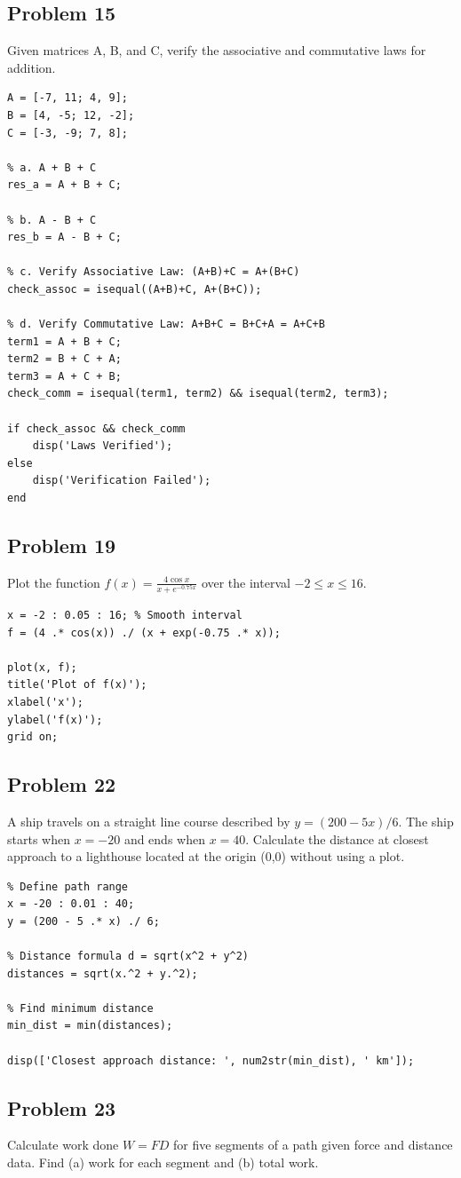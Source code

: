 \documentclass[DIN, pagenumber=false, fontsize=11pt, parskip=half]{scrartcl}
\newcommand{\myproblem}[1]{\subsection*{#1}}
\begin{document}
\myproblem{Problem 15}
Given matrices A, B, and C, verify the associative and commutative laws for addition.

\begin{lstlisting}
A = [-7, 11; 4, 9];
B = [4, -5; 12, -2];
C = [-3, -9; 7, 8];

% a. A + B + C
res_a = A + B + C;

% b. A - B + C
res_b = A - B + C;

% c. Verify Associative Law: (A+B)+C = A+(B+C)
check_assoc = isequal((A+B)+C, A+(B+C));

% d. Verify Commutative Law: A+B+C = B+C+A = A+C+B
term1 = A + B + C;
term2 = B + C + A;
term3 = A + C + B;
check_comm = isequal(term1, term2) && isequal(term2, term3);

if check_assoc && check_comm
    disp('Laws Verified');
else
    disp('Verification Failed');
end
\end{lstlisting}

\myproblem{Problem 19}
Plot the function $f(x)=\frac{4 \cos x}{x+e^{-0.75x}}$ over the interval $-2\le x\le16$.

\begin{lstlisting}
x = -2 : 0.05 : 16; % Smooth interval
f = (4 .* cos(x)) ./ (x + exp(-0.75 .* x));

plot(x, f);
title('Plot of f(x)');
xlabel('x');
ylabel('f(x)');
grid on;
\end{lstlisting}

\myproblem{Problem 22}
A ship travels on a straight line course described by $y=(200-5x)/6$. The ship starts when $x=-20$ and ends when $x=40$. Calculate the distance at closest approach to a lighthouse located at the origin (0,0) without using a plot.

\begin{lstlisting}
% Define path range
x = -20 : 0.01 : 40;
y = (200 - 5 .* x) ./ 6;

% Distance formula d = sqrt(x^2 + y^2)
distances = sqrt(x.^2 + y.^2);

% Find minimum distance
min_dist = min(distances);

disp(['Closest approach distance: ', num2str(min_dist), ' km']);
\end{lstlisting}

\myproblem{Problem 23}
Calculate work done $W=FD$ for five segments of a path given force and distance data. Find (a) work for each segment and (b) total work.
\end{document}
